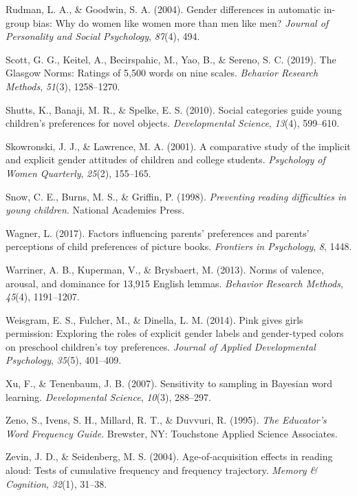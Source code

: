 \documentclass[
  english,
  ,man,floatsintext]{apa6}
\begin{document}
\leavevmode\hypertarget{ref-rudman2004gender}{}%
Rudman, L. A., \& Goodwin, S. A. (2004). Gender differences in automatic in-group bias: Why do women like women more than men like men? \emph{Journal of Personality and Social Psychology}, \emph{87}(4), 494.

\leavevmode\hypertarget{ref-scott2019glasgow}{}%
Scott, G. G., Keitel, A., Becirspahic, M., Yao, B., \& Sereno, S. C. (2019). The Glasgow Norms: Ratings of 5,500 words on nine scales. \emph{Behavior Research Methods}, \emph{51}(3), 1258--1270.

\leavevmode\hypertarget{ref-shutts2010social}{}%
Shutts, K., Banaji, M. R., \& Spelke, E. S. (2010). Social categories guide young children's preferences for novel objects. \emph{Developmental Science}, \emph{13}(4), 599--610.

\leavevmode\hypertarget{ref-skowronski2001comparative}{}%
Skowronski, J. J., \& Lawrence, M. A. (2001). A comparative study of the implicit and explicit gender attitudes of children and college students. \emph{Psychology of Women Quarterly}, \emph{25}(2), 155--165.

\leavevmode\hypertarget{ref-snow1998preventing}{}%
Snow, C. E., Burns, M. S., \& Griffin, P. (1998). \emph{Preventing reading difficulties in young children}. National Academies Press.

\leavevmode\hypertarget{ref-wagner2017factors}{}%
Wagner, L. (2017). Factors influencing parents' preferences and parents' perceptions of child preferences of picture books. \emph{Frontiers in Psychology}, \emph{8}, 1448.

\leavevmode\hypertarget{ref-warriner2013norms}{}%
Warriner, A. B., Kuperman, V., \& Brysbaert, M. (2013). Norms of valence, arousal, and dominance for 13,915 English lemmas. \emph{Behavior Research Methods}, \emph{45}(4), 1191--1207.

\leavevmode\hypertarget{ref-weisgram2014pink}{}%
Weisgram, E. S., Fulcher, M., \& Dinella, L. M. (2014). Pink gives girls permission: Exploring the roles of explicit gender labels and gender-typed colors on preschool children's toy preferences. \emph{Journal of Applied Developmental Psychology}, \emph{35}(5), 401--409.

\leavevmode\hypertarget{ref-xu2007b}{}%
Xu, F., \& Tenenbaum, J. B. (2007). Sensitivity to sampling in Bayesian word learning. \emph{Developmental Science}, \emph{10}(3), 288--297.

\leavevmode\hypertarget{ref-tasa_norms}{}%
Zeno, S., Ivens, S. H., Millard, R. T., \& Duvvuri, R. (1995). \emph{The Educator's Word Frequency Guide}. Brewster, NY: Touchstone Applied Science Associates.

\leavevmode\hypertarget{ref-zevin2004age}{}%
Zevin, J. D., \& Seidenberg, M. S. (2004). Age-of-acquisition effects in reading aloud: Tests of cumulative frequency and frequency trajectory. \emph{Memory \& Cognition}, \emph{32}(1), 31--38.
\end{document}
